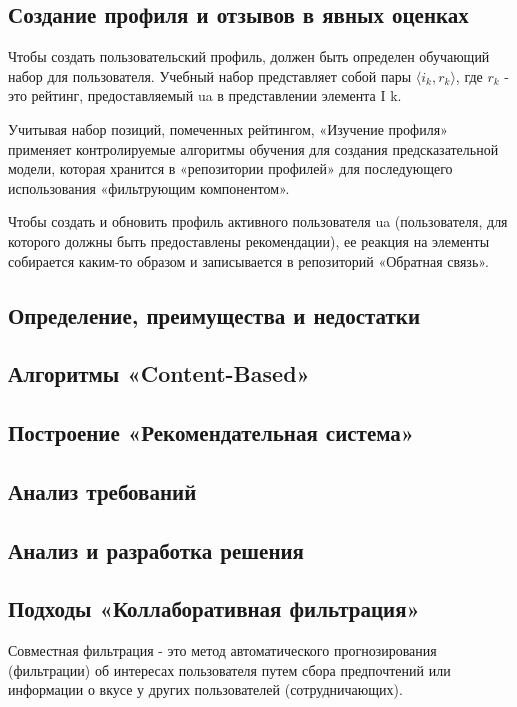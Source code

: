 \subsection{Создание профиля и отзывов в явных оценках}

Чтобы создать пользовательский профиль, должен быть определен обучающий набор для пользователя. Учебный набор представляет собой пары $⟨i_{k}, r_{k}⟩$, где $r_{k}$ - это рейтинг, предоставляемый ua в представлении элемента I k.

Учитывая набор позиций, помеченных рейтингом, «Изучение профиля» применяет контролируемые алгоритмы обучения для создания предсказательной модели, которая хранится в «репозитории профилей» для последующего использования «фильтрующим компонентом».

Чтобы создать и обновить профиль активного пользователя ua (пользователя, для которого должны быть предоставлены рекомендации), ее реакция на элементы собирается каким-то образом и записывается в репозиторий «Обратная связь»\cite{retrieve}.

\subsection{Определение, преимущества и недостатки}
\subsection{Алгоритмы «Content-Based»}

\subsection{Построение «Рекомендательная система»}
\subsection{Анализ требований}
\subsection{Анализ и разработка решения}


\subsection{Подходы «Коллаборативная фильтрация»}


Совместная фильтрация - это метод автоматического прогнозирования (фильтрации) об интересах пользователя путем сбора предпочтений или информации о вкусе у других пользователей (сотрудничающих).


